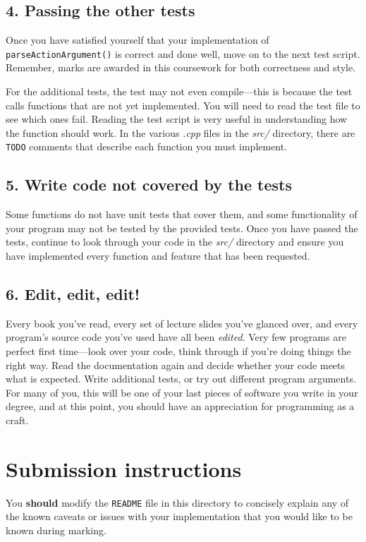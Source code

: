 \documentclass[a4paper]{article}
\begin{document}
\subsection*{4. Passing the other tests}\label{sec:tasks more-tests}
Once you have satisfied yourself that your implementation of \texttt{parseActionArgument()} is correct and done well, move on to the next test script. Remember, marks are awarded in this coursework for both correctness and style. 

For the additional tests, the test may not even compile---this is because the test calls functions that are not yet implemented. You will need to read the test file to see which ones fail. Reading the test script is very useful in understanding how the function should work. In the various \emph{.cpp} files in the \emph{src/} directory, there are \texttt{TODO} comments that describe each function you must implement.


\subsection*{5. Write code not covered by the tests}\label{sec:tasks untested-code}
Some functions do not have unit tests that cover them, and some functionality of your program may not be tested by the provided tests. Once you have passed the tests, continue to look through your code in the \emph{src/} directory and ensure you have implemented every function and feature that has been requested. 


\subsection*{6. Edit, edit, edit!}\label{sec:tasks edit}
Every book you've read, every set of lecture slides you've glanced over, and every program's source code you've used have all been \emph{edited}. Very few programs are perfect first time—look over your code, think through if you're doing things the right way. Read the documentation again and decide whether your code meets what is expected. Write additional tests, or try out different program arguments. For many of you, this will be one of your last pieces of software you write in your degree, and at this point, you should have an appreciation for programming as a craft.



\section*{Submission instructions}
You \textbf{should} modify the \texttt{README} file in this directory to concisely explain any of the known caveats or issues with your implementation that you would like to be known during marking.
\end{document}
